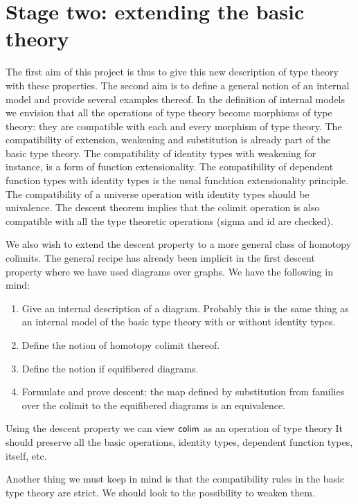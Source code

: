 \section{Stage two: extending the basic theory}\label{stage2}
The first aim of this project is thus to give this new description of type
theory with these properties. The second aim is to define a general notion of
an internal model and provide several examples thereof. In the definition of
internal models we envision that all the operations of type theory become
morphisms of type theory: they are compatible with each and every morphism
of type theory. The compatibility of extension, weakening and substitution is
already part of the basic type theory. The compatibility of identity types
with weakening for instance, is a form of function extensionality. The 
compatibility of dependent function types with identity types is the usual
funchtion extensionality principle. The
compatibility of a universe operation with identity types should be univalence.
The descent theorem implies that the colimit operation is also compatible with
all the type theoretic operations (sigma and id are checked).

We also wish to extend the descent property to a more general class of homotopy
colimits. The general recipe has already been implicit in the first descent
property where we have used diagrams over graphs. We have the following in mind:
\begin{enumerate}
\item Give an internal description of a diagram. Probably this is the same thing
      as an internal model of the basic type theory with or without identity types.
\item Define the notion of homotopy colimit thereof.
\item Define the notion if equifibered diagrams.
\item Formulate and prove descent: the map defined by substitution
 from families over the colimit to the equifibered diagrams is an equivalence.
\end{enumerate}

Using the descent property we can view $\mathsf{colim}$ as an operation of type theory
It should preserve all the basic operations, identity types, dependent function
types, itself, etc.

Another thing we must keep in mind is that the compatibility rules in the basic
type theory are strict. We should look to the possibility to weaken them.
